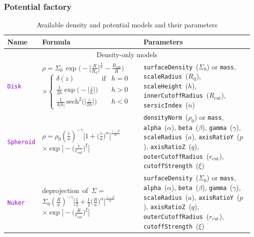 \documentclass[12pt]{article}
\newcommand{\ttt}[1]{\textcolor{darkviolet}{\texttt{#1}}}
\newcommand{\ppp}[1]{\textcolor{darkolive} {\texttt{#1}}}
\begin{document}
\subsubsection{Potential factory}  \label{sec:PotentialFactory}

\begin{table}
\caption{Available density and potential models and their parameters}  \label{tab:PotentialParams}
\hspace{-2mm}\begin{tabular}{l m{50mm} >{\raggedright\arraybackslash}m{80mm}}
Name & Formula & Parameters \\
\hline
\multicolumn{3}{c}{Density-only models} \\

\ttt{Disk} & $\rho = \Sigma_0\,\exp\big(-\big[\frac{R}{R_\mathrm{d}}\big]^{\frac1n} - \frac{R_\mathrm{cut}}{R}\big)$
$\times\left\{ \begin{array}{ll} \delta(z)\qquad\qquad\mbox{if} & h=0 \\[1mm]
\frac{1}{2h} \exp\big(-\big|\frac{z}{h}\big|\big) & h>0 \\[1mm]
\frac{1}{4|h|}\, \mathrm{sech}^2\big(\big|\frac{z}{2h}\big|\big) & h<0 \end{array} \right. $ &
\ppp{surfaceDensity}~($\Sigma_0$) or \ppp{mass}, \ppp{scaleRadius}~($R_\mathrm{d}$), \ppp{scaleHeight}~($h$), \ppp{innerCutoffRadius}~($R_\mathrm{cut}$), \ppp{sersicIndex}~($n$)\\

\ttt{Spheroid} & $\rho = \rho_0  \left(\frac{\tilde r}{a}\right)^{-\gamma} \Big[ 1 + \big(\frac{\tilde r}{a}\big)^\alpha \Big]^{\frac{\gamma-\beta}{\alpha}}$ $\times \exp\Big[ -\big(\frac{\tilde r}{r_\mathrm{cut}}\big)^\xi\Big] $ &
\ppp{densityNorm}~($\rho_0$) or \ppp{mass}, \ppp{alpha}~($\alpha$), \ppp{beta}~($\beta$), \ppp{gamma}~($\gamma$), \ppp{scaleRadius}~($a$), \ppp{axisRatioY}~($p$), \ppp{axisRatioZ}~($q$), \ppp{outerCutoffRadius}~($r_\mathrm{cut}$), \ppp{cutoffStrength}~($\xi$) \\[2mm]

\ttt{Nuker} & \mbox{deprojection of $\Sigma={}$} \mbox{$\Sigma_0 \left(\frac{R}{a}\right)^{-\gamma} \Big[ \frac12 + \frac12\big(\frac{R}{a}\big)^\alpha \Big]^{\frac{\gamma-\beta}{\alpha}}$} $\times \exp\Big[ -\big(\frac{R}{r_\mathrm{cut}}\big)^\xi\Big] $  & \ppp{surfaceDensity}~($\Sigma_0$) or \ppp{mass}, \ppp{alpha}~($\alpha$), \ppp{beta}~($\beta$), \ppp{gamma}~($\gamma$), \ppp{scaleRadius}~($a$), \ppp{axisRatioY}~($p$), \ppp{axisRatioZ}~($q$), \ppp{outerCutoffRadius}~($r_\mathrm{cut}$), \ppp{cutoffStrength}~($\xi$) \\[2mm]


\end{tabular}
\end{table}
\end{document}
